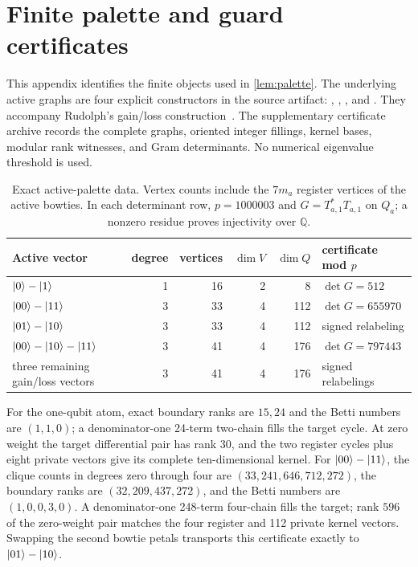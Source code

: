 \section{Finite palette and guard certificates}
\label{app:palette}

This appendix identifies the finite objects used in \cref{lem:palette}.  The
underlying active graphs are four explicit constructors in the source artifact:
, , , and
.  They accompany Rudolph's gain/loss
construction~\cite{rudolph2026universal}.
The supplementary certificate archive records the complete graphs, oriented
integer fillings, kernel bases, modular rank witnesses, and Gram determinants.
No numerical eigenvalue threshold is used.

\begin{table}[ht]
\centering
\begin{tabularx}{\linewidth}{@{}>{\raggedright\arraybackslash}Xrrrr>{\raggedright\arraybackslash}X@{}}
\toprule
Active vector & degree & vertices & \(\dim V\) & \(\dim Q\) & certificate mod \(p\) \\
\midrule
\(\lvert 0\rangle-\lvert 1\rangle\) & 1 & 16 & 2 & 8 &
\(\det G=512\) \\
\(\lvert 00\rangle-\lvert 11\rangle\) & 3 & 33 & 4 & 112 &
\(\det G=655970\) \\
\(\lvert 01\rangle-\lvert 10\rangle\) & 3 & 33 & 4 & 112 &
signed relabeling \\
\(\lvert 00\rangle-\lvert 10\rangle-\lvert 11\rangle\) & 3 & 41 & 4 & 176 &
\(\det G=797443\) \\
three remaining gain/loss vectors & 3 & 41 & 4 & 176 &
signed relabelings \\
\bottomrule
\end{tabularx}
\caption{Exact active-palette data.  Vertex counts include the \(7m_a\)
register vertices of the active bowties.  In each determinant row,
\(p=1000003\) and \(G=T_{a,1}^*T_{a,1}\) on \(Q_a\); a nonzero residue
proves injectivity over \(\mathbb Q\).}
\label{tab:palette-certificates}
\end{table}

For the one-qubit atom, exact boundary ranks are \(15,24\) and the Betti
numbers are \((1,1,0)\); a denominator-one 24-term two-chain fills the target
cycle.  At zero weight the target differential pair has rank \(30\), and the
two register cycles plus eight private vectors give its complete
ten-dimensional kernel.  For \(\lvert 00\rangle-\lvert 11\rangle\), the clique counts in
degrees zero through four are
\((33,241,646,712,272)\), the boundary ranks are
\((32,209,437,272)\), and the Betti numbers are \((1,0,0,3,0)\).
A denominator-one 248-term four-chain fills the target; rank \(596\) of the
zero-weight pair matches the four register and 112 private kernel vectors.
Swapping the second bowtie petals transports this certificate exactly to
\(\lvert 01\rangle-\lvert 10\rangle\).

